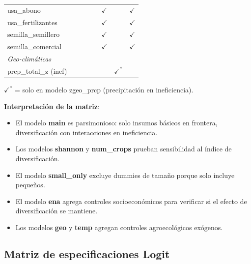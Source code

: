 \documentclass[11pt,a4paper]{article}
\begin{document}
\begin{table}[H]
\begin{threeparttable}
\begin{tabular}{p{4cm}ccccccc}
usa\_abono & & & & & $\checkmark$ & & $\checkmark$ \\
usa\_fertilizantes & & & & & $\checkmark$ & & $\checkmark$ \\
semilla\_semillero & & & & & $\checkmark$ & & $\checkmark$ \\
semilla\_comercial & & & & & $\checkmark$ & & $\checkmark$ \\
\midrule
\multicolumn{8}{l}{\textit{Geo-climáticas}} \\
prcp\_total\_z (inef) & & & & & & $\checkmark^*$ & \\
\bottomrule
\end{tabular}
\begin{tablenotes}
\footnotesize
\item $\checkmark^*$ = solo en modelo zgeo\_prcp (precipitación en ineficiencia).
\end{tablenotes}
\end{threeparttable}
\end{table}

\textbf{Interpretación de la matriz}: 
\begin{itemize}
    \item El modelo \textbf{main} es parsimonioso: solo insumos básicos en frontera, diversificación con interacciones en ineficiencia.
    \item Los modelos \textbf{shannon} y \textbf{num\_crops} prueban sensibilidad al índice de diversificación.
    \item El modelo \textbf{small\_only} excluye dummies de tamaño porque solo incluye pequeños.
    \item El modelo \textbf{ena} agrega controles socioeconómicos para verificar si el efecto de diversificación se mantiene.
    \item Los modelos \textbf{geo} y \textbf{temp} agregan controles agroecológicos exógenos.
\end{itemize}

\subsection{Matriz de especificaciones Logit}
\end{document}

